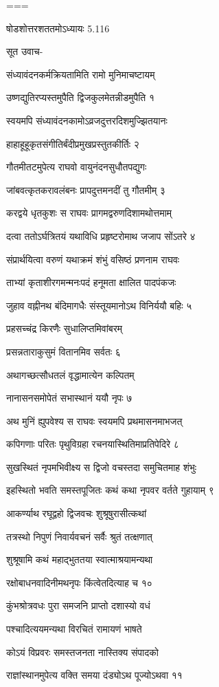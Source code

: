 ===




षोडशोत्तरशततमोऽध्यायः 5.116

सूत उवाच-

संध्यावंदनकर्मक्रियतामिति रामो मुनिमाचष्टायम्

उष्णद्युतिरप्यस्तमुपैति द्विजकुलमेतन्नीडमुपैति १

स्वयमपि संध्यावंदनकामोऽव्रजदुत्तरदिशमुज्झितयानः

हाहाहूहूकृतसंगीतिर्बंदीप्रमुखप्रस्तुतकीर्तिः २

गौतमीतटमुपेत्य राघवो वायुनंदनसुधौतपद्युगः

जांबवत्कृतकरावलंबनः प्रापदुत्तमनदीं तु गौतमीम् ३

करद्वये धृतकुशः स राघवः प्रागमद्वरुणदिशामथोत्तमाम्

दत्वा ततोऽर्घत्रितयं यथाविधि प्रहृष्टरोमाथ जजाप सोंऽतरे ४

संप्रार्थयित्वा वरुणं यथाक्रमं शंभुं वसिष्ठं प्रणनाम राघवः

ताभ्यां कृताशीरगमन्मनःपदं हनूमता क्षालित पादपंकजः

जुहाव वह्नीनथ बंदिमागधैः संस्तूयमानोऽथ विनिर्ययौ बहिः ५

प्रहसच्चंद्र किरणैः सुधालिप्तमिवांबरम्

प्रसन्नताराकुसुमं वितानमिव सर्वतः ६

अथागच्छत्सौधतलं वृद्धामात्येन कल्पितम्

नानासनसमोपेतं सभास्थानं ययौ नृपः ७

अथ मुनिं ह्युपवेश्य स राघवः स्वयमपि प्रथमासनमाभजत्

कपिगणाः परितः पृथुविग्रहा रचनयास्थितिमाप्रतिपेदिरे ८

सुखस्थितं नृपमभिवीक्ष्य स द्विजो वचस्तदा समुचितमाह शंभुः

इहस्थितो भवति समस्तपूजितः कथं कथा नृपवर वर्तते गुहायाम् ९

आकर्ण्याथ रघूद्वहो द्विजवचः शुश्रूषुरासीत्कथां

तत्रस्थो निपुणं निवार्यवचनं सर्वैः श्रुतं तत्क्षणात्

शुश्रूषामि कथं महाद्भुततया स्वात्माश्रयामन्यथा

रक्षोबाधनवादिनीमथनृपः किंत्वेतदित्याह च १०

कुंभश्रोत्रवधः पुरा समजनि प्राप्तो दशास्यो वधं

पश्चादित्ययमन्यथा विरचितं रामायणं भाषते

कोऽयं विप्रवरः समस्तजनता नास्तिक्य संपादको

राज्ञांस्थानमुपेत्य वक्ति समया दंड्योऽथ पूज्योऽथवा ११


